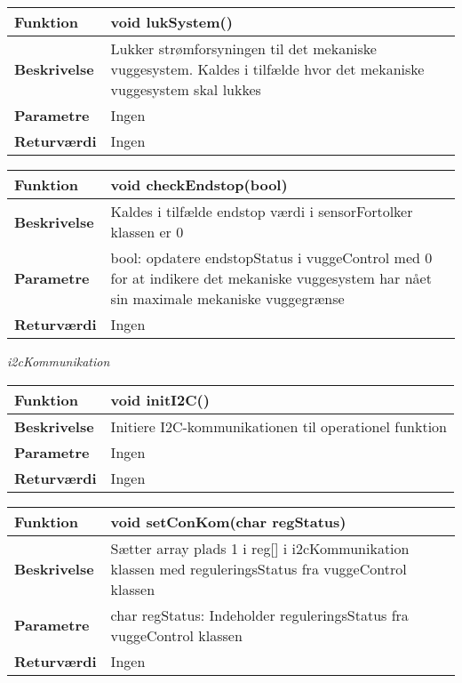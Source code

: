\begin{center}
    \begin{tabular}{ | l | p{10cm} |}
    \hline
    \textbf{Funktion}	 	& void lukSystem()								\\ \hline
    \textbf{Beskrivelse} 	& Lukker strømforsyningen til det mekaniske vuggesystem. Kaldes i tilfælde hvor det mekaniske vuggesystem skal lukkes					\\ \hline
    \textbf{Parametre}		& Ingen														 		\\ \hline
    \textbf{Returværdi} 	& Ingen		 												\\ \hline
    \end{tabular}
\end{center}

\begin{center}
    \begin{tabular}{ | l | p{10cm} |}
    \hline
    \textbf{Funktion}	 	& void checkEndstop(bool)								\\ \hline
    \textbf{Beskrivelse} 	& Kaldes i tilfælde endstop værdi i sensorFortolker klassen er 0				\\ \hline
    \textbf{Parametre}		& bool: opdatere endstopStatus i vuggeControl med 0 for at indikere det mekaniske vuggesystem har nået sin maximale mekaniske vuggegrænse					\\ \hline
    \textbf{Returværdi} 	& Ingen		 												\\ \hline
    \end{tabular}
\end{center}

\textit{i2cKommunikation} \\

\begin{center}
    \begin{tabular}{ | l | p{10cm} |}
    \hline
    \textbf{Funktion}	 	& void initI2C()											\\ \hline
    \textbf{Beskrivelse} 	& Initiere I2C-kommunikationen til operationel funktion						\\ \hline
    \textbf{Parametre}		& Ingen												 		\\ \hline
    \textbf{Returværdi} 	& Ingen		 												\\ \hline
    \end{tabular}
\end{center}

\begin{center}
    \begin{tabular}{ | l | p{10cm} |}
    \hline
    \textbf{Funktion}	 	& void setConKom(char regStatus)								\\ \hline
    \textbf{Beskrivelse} 	& Sætter array plads 1 i reg[] i i2cKommunikation klassen med reguleringsStatus fra vuggeControl klassen		\\ \hline
    \textbf{Parametre}		& char regStatus: Indeholder reguleringsStatus fra vuggeControl klassen \\ \hline
    \textbf{Returværdi} 	& Ingen		 												\\ \hline
    \end{tabular}
\end{center}

